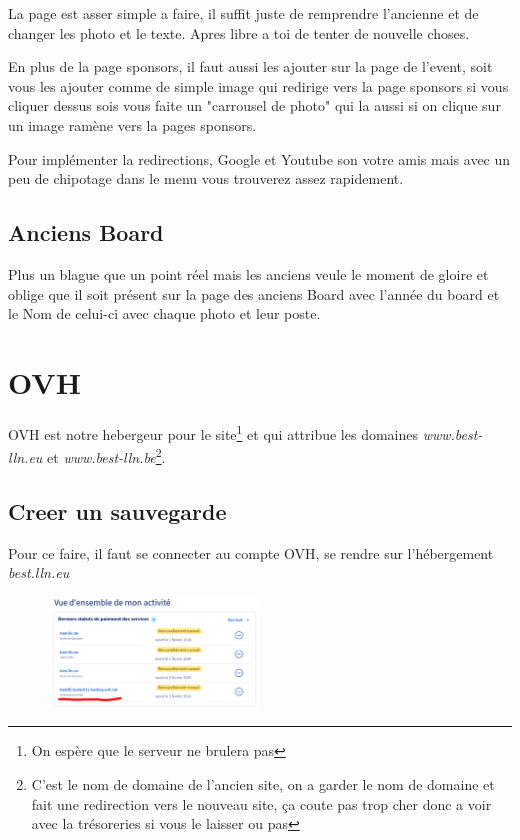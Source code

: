 \documentclass[12pt]{article}
\begin{document}
	La page est asser simple a faire, il suffit juste de remprendre l'ancienne et de changer les photo et le texte. Apres libre a toi de tenter de nouvelle choses.
		
	En plus de la page sponsors, il faut aussi les ajouter sur la page  de l'event, soit vous les ajouter comme de simple image qui redirige vers la page sponsors si vous cliquer dessus sois vous faite un "carrousel de photo" qui la aussi si on clique sur un image ramène vers la pages sponsors.
		
		Pour implémenter la redirections, Google et Youtube son votre amis mais avec un peu de chipotage dans le menu vous trouverez assez rapidement.
	
	\subsection{Anciens Board}
		Plus un blague que un point réel mais les anciens veule le moment de gloire et oblige que il soit présent sur la page des anciens Board avec l'année du board et le Nom de celui-ci avec chaque photo et leur poste.
	
	
\section{OVH}
	OVH est notre hebergeur pour le site\footnote{On espère que le serveur ne brulera pas} et qui attribue les domaines \textit{www.best-lln.eu} et \textit{www.best-lln.be}\footnote{C'est le nom de domaine de l'ancien site, on a garder le nom de domaine et fait une redirection vers le nouveau site, ça coute pas trop cher donc a voir avec la trésoreries si vous le laisser ou pas}. 
	\subsection{Creer un sauvegarde}
	\label{creersauvegarde}
		Pour ce faire, il faut se connecter au compte OVH, se rendre sur l'hébergement \textit{best.lln.eu}
		
		\begin{figure}[htp]
			\centering
			\includegraphics[width=0.5\textwidth]{img/OVH.png}
		\end{figure}
		
\end{document}
